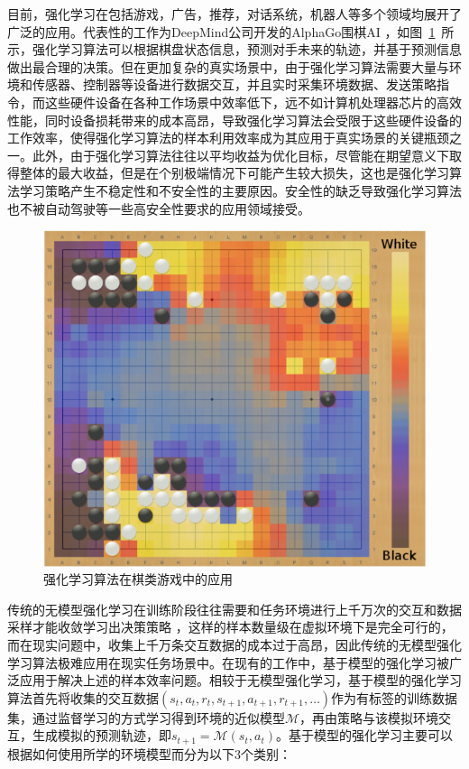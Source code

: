 目前，强化学习在包括游戏，广告，推荐，对话系统，机器人等多个领域均展开了广泛的应用\cite{cai2017real,wang2018reinforcement,li2016deep,riedmiller2009reinforcement}。代表性的工作为DeepMind公司开发的AlphaGo围棋AI \cite{chen2016evolution}，如图~\ref{fig:rl-go}~所示，强化学习算法可以根据棋盘状态信息，预测对手未来的轨迹，并基于预测信息做出最合理的决策\cite{holcomb2018overview}。但在更加复杂的真实场景中，由于强化学习算法需要大量与环境和传感器、控制器等设备进行数据交互，并且实时采集环境数据、发送策略指令，而这些硬件设备在各种工作场景中效率低下，远不如计算机处理器芯片的高效性能，同时设备损耗带来的成本高昂，导致强化学习算法会受限于这些硬件设备的工作效率\cite{zhang2021robust,yao2021sample}，使得强化学习算法的样本利用效率成为其应用于真实场景的关键瓶颈之一\cite{arulkumaran2017deep,kober2013reinforcement}。此外，由于强化学习算法往往以平均收益为优化目标，尽管能在期望意义下取得整体的最大收益，但是在个别极端情况下可能产生较大损失，这也是强化学习算法学习策略产生不稳定性和不安全性的主要原因。安全性的缺乏导致强化学习算法也不被自动驾驶等一些高安全性要求的应用领域接受\cite{ling2015application,cheng2019end,zhang2020cautious}。

\begin{figure}
  \centering
  \includegraphics[width=0.8\linewidth]{figures/rl-go.png}
  \caption{强化学习算法在棋类游戏中的应用}
  \label{fig:rl-go}
\end{figure}


传统的无模型强化学习在训练阶段往往需要和任务环境进行上千万次的交互和数据采样才能收敛学习出决策策略 \cite{degris2012model}，这样的样本数量级在虚拟环境下是完全可行的，而在现实问题中，收集上千万条交互数据的成本过于高昂，因此传统的无模型强化学习算法极难应用在现实任务场景中。在现有的工作中，基于模型的强化学习被广泛应用于解决上述的样本效率问题\cite{osband2014model,moerland2020model}。相较于无模型强化学习，基于模型的强化学习算法首先将收集的交互数据$(s_t,a_t,r_t,s_{t+1},a_{t+1},r_{t+1},\ldots)$作为有标签的训练数据集，通过监督学习的方式学习得到环境的近似模型$\mathcal{M}$，再由策略与该模拟环境交互，生成模拟的预测轨迹，即$s_{t+1}=\mathcal{M}(s_t,a_t)$。基于模型的强化学习主要可以根据如何使用所学的环境模型而分为以下3个类别\cite{pal2020brief}：

